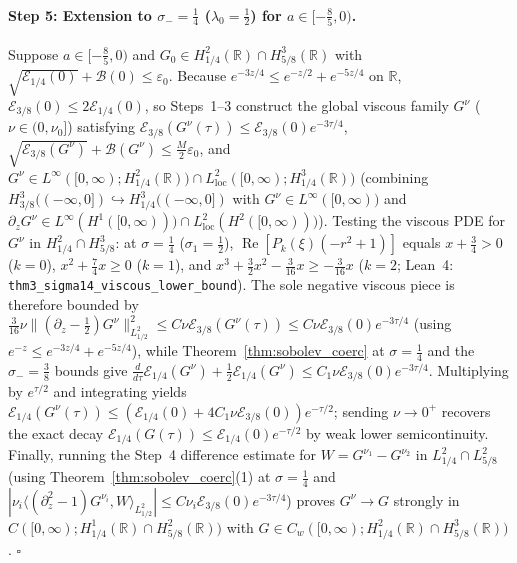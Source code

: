 \documentclass[11pt,a4paper]{article}
\begin{document}
\paragraph{Step 5: Extension to $\sigma_- = \frac{1}{4}$ ($\lambda_0 = \frac{1}{2}$) for $a \in [-\frac{8}{5}, 0)$.}
Suppose $a \in [-\frac{8}{5}, 0)$ and $G_0 \in H^2_{1/4}(\mathbb{R})\cap H^3_{5/8}(\mathbb{R})$ with $\sqrt{\mathcal{E}_{1/4}(0)} + \mathcal{B}(0) \le \varepsilon_0$. Because $e^{-3z/4} \le e^{-z/2} + e^{-5z/4}$ on $\mathbb{R}$, $\mathcal{E}_{3/8}(0) \le 2\mathcal{E}_{1/4}(0)$, so Steps~1--3 construct the global viscous family $G^\nu$ ($\nu \in (0,\nu_0]$) satisfying $\mathcal{E}_{3/8}(G^\nu(\tau)) \le \mathcal{E}_{3/8}(0)e^{-3\tau/4}$, $\sqrt{\mathcal{E}_{3/8}(G^\nu)} + \mathcal{B}(G^\nu) \le \frac{M}{2}\varepsilon_0$, and $G^\nu \in L^\infty([0,\infty); H^2_{1/4}(\mathbb{R})) \cap L^2_{\mathrm{loc}}([0,\infty); H^3_{1/4}(\mathbb{R}))$ (combining $H^3_{3/8}((-\infty,0]) \hookrightarrow H^3_{1/4}((-\infty,0])$ with $G^\nu \in L^\infty([0,\infty))$ and $\partial_z G^\nu \in L^\infty(H^1([0,\infty))) \cap L^2_{\mathrm{loc}}(H^2([0,\infty)))$). Testing the viscous PDE for $G^\nu$ in $H^2_{1/4}\cap H^3_{5/8}$: at $\sigma = \frac{1}{4}$ ($\sigma_1 = \frac{1}{2}$), $\operatorname{Re}[P_k(\xi)(-r^2+1)]$ equals $x + \frac{3}{4} > 0$ ($k=0$), $x^2 + \frac{7}{4}x \ge 0$ ($k=1$), and $x^3 + \frac{3}{2}x^2 - \frac{3}{16}x \ge -\frac{3}{16}x$ ($k=2$; Lean~4: \texttt{thm3\_sigma14\_viscous\_lower\_bound}). The sole negative viscous piece is therefore bounded by $\frac{3}{16}\nu\|(\partial_z - \frac{1}{2})G^\nu\|_{L^2_{1/2}}^2 \le C\nu\mathcal{E}_{3/8}(G^\nu(\tau)) \le C\nu\mathcal{E}_{3/8}(0)e^{-3\tau/4}$ (using $e^{-z} \le e^{-3z/4} + e^{-5z/4}$), while Theorem~\ref{thm:sobolev_coerc} at $\sigma = \frac{1}{4}$ and the $\sigma_- = \frac{3}{8}$ bounds give $\frac{d}{d\tau}\mathcal{E}_{1/4}(G^\nu) + \frac{1}{2}\mathcal{E}_{1/4}(G^\nu) \le C_1\nu\mathcal{E}_{3/8}(0)e^{-3\tau/4}$. Multiplying by $e^{\tau/2}$ and integrating yields $\mathcal{E}_{1/4}(G^\nu(\tau)) \le (\mathcal{E}_{1/4}(0) + 4C_1\nu\mathcal{E}_{3/8}(0))e^{-\tau/2}$; sending $\nu \to 0^+$ recovers the exact decay $\mathcal{E}_{1/4}(G(\tau)) \le \mathcal{E}_{1/4}(0)e^{-\tau/2}$ by weak lower semicontinuity. Finally, running the Step~4 difference estimate for $W = G^{\nu_1} - G^{\nu_2}$ in $L^2_{1/4}\cap L^2_{5/8}$ (using Theorem~\ref{thm:sobolev_coerc}(1) at $\sigma = \frac{1}{4}$ and $|\nu_i\langle(\partial_z^2-1)G^{\nu_i}, W\rangle_{L^2_{1/2}}| \le C\nu_i\mathcal{E}_{3/8}(0)e^{-3\tau/4}$) proves $G^\nu \to G$ strongly in $C([0,\infty); H^1_{1/4}(\mathbb{R})\cap H^2_{5/8}(\mathbb{R}))$ with $G \in C_w([0,\infty); H^2_{1/4}(\mathbb{R})\cap H^3_{5/8}(\mathbb{R}))$. $\square$
\end{document}
